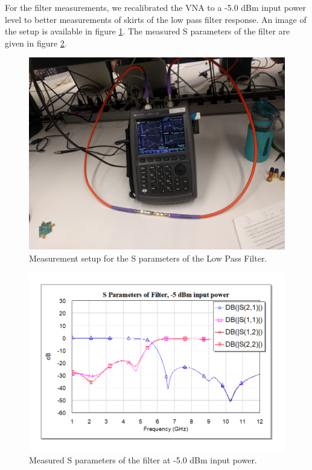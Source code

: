 \documentclass[twocolumn, aps, floatfix]{revtex4-1}
\begin{document}
 For the filter measurements, we recalibrated the VNA to a -5.0 dBm input power level to better measurements of skirts of the low pass filter response. An image of the setup is available in figure \ref{fig:filterimg}. The measured S parameters of the filter are given in figure \ref{fig:filterSparams}.

    \begin{figure}[!htbp]
    \centering
    \includegraphics[scale=0.05]{Filter.jpg}
    \caption{Measurement setup for the S parameters of the Low Pass Filter.}
    \label{fig:filterimg}
    \end{figure}

    \begin{figure}[!htbp]
    \centering
    \includegraphics[scale=0.35]{filter_S_params.png}
    \caption{Measured S parameters of the filter at -5.0 dBm input power.}
    \label{fig:filterSparams}
    \end{figure}
\end{document}
